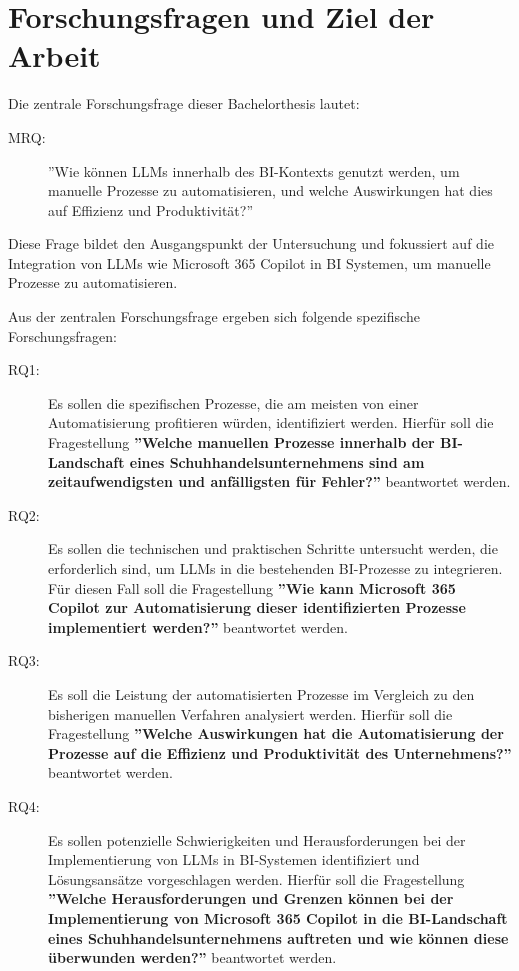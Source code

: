 
\section{Forschungsfragen und Ziel der Arbeit}

Die zentrale Forschungsfrage dieser Bachelorthesis lautet:

\begin{description}
    \item[MRQ:] ''Wie können LLMs innerhalb des BI-Kontexts genutzt werden, um manuelle Prozesse zu automatisieren, und welche Auswirkungen hat dies auf Effizienz und Produktivität?''
\end{description}
Diese Frage bildet den Ausgangspunkt der Untersuchung und fokussiert auf die Integration von LLMs wie Microsoft 365 Copilot in BI Systemen, um manuelle Prozesse zu automatisieren.

Aus der zentralen Forschungsfrage ergeben sich folgende spezifische Forschungsfragen:
\begin{description}
    \item[RQ1:] Es sollen die spezifischen Prozesse, die am meisten von einer Automatisierung profitieren würden, identifiziert werden. Hierfür soll die Fragestellung \textbf{''Welche manuellen Prozesse innerhalb der BI-Landschaft eines Schuhhandelsunternehmens sind am zeitaufwendigsten und anfälligsten für Fehler?''} beantwortet werden.
    \item[RQ2:] Es sollen die technischen und praktischen Schritte untersucht werden, die erforderlich sind, um LLMs in die bestehenden BI-Prozesse zu integrieren. Für diesen Fall soll die Fragestellung \textbf{''Wie kann Microsoft 365 Copilot zur Automatisierung dieser identifizierten Prozesse implementiert werden?''} beantwortet werden.
    \item[RQ3:] Es soll die Leistung der automatisierten Prozesse im Vergleich zu den bisherigen manuellen Verfahren analysiert werden. Hierfür soll die Fragestellung \textbf{''Welche Auswirkungen hat die Automatisierung der Prozesse auf die Effizienz und Produktivität des Unternehmens?''} beantwortet werden. 
    \item[RQ4:] Es sollen potenzielle Schwierigkeiten und Herausforderungen bei der Implementierung von LLMs in BI-Systemen identifiziert und Lösungsansätze vorgeschlagen werden. Hierfür soll die Fragestellung \textbf{''Welche Herausforderungen und Grenzen können bei der Implementierung von Microsoft 365 Copilot in die BI-Landschaft eines Schuhhandelsunternehmens auftreten und wie können diese überwunden werden?''} beantwortet werden. 
\end{description}

